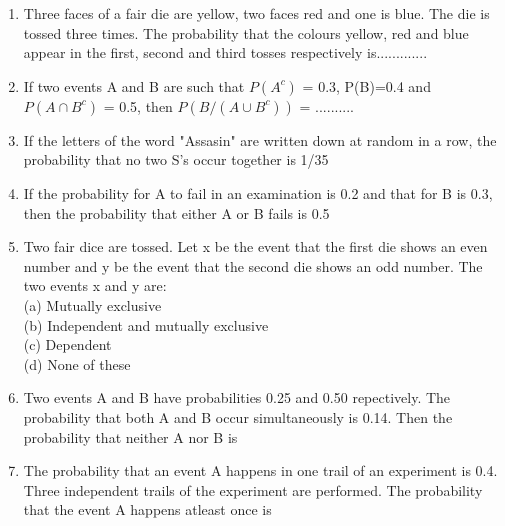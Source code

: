 \documentclass[journal,12pt,twocolumn]{IEEEtran}
\begin{document}
\begin{enumerate}[label=\arabic*]
	\item Three faces of a fair die are yellow, two faces red and one is blue. The die is tossed three times. The probability that the colours yellow, red and blue appear in the first, second and third tosses respectively is.............\\ 
  	\item If two events A and B are such that $P(A^{c})$ = 0.3, P(B)=0.4 and $P(A \cap B^{c})$ = 0.5, then $P(B/(A \cup B^{c}))$ = ..........\\
	\item If the letters of the word "Assasin" are written down at random in a row, the probability that no two S's occur together is 1/35\\
	\item If the probability for A to fail in an examination is 0.2 and that for B is 0.3, then the probability that either A or B fails is 0.5\\
	\item Two fair dice are tossed. Let x be the event that the first die shows an even number and y be the event that the second die shows an odd number. The two events x and y are:\\
	(a) Mutually exclusive\\
	(b) Independent and mutually exclusive\\
	(c) Dependent\\
	(d) None of these\\
	\item Two events A and B have probabilities 0.25 and 0.50 repectively. The probability that both A and B occur simultaneously is 0.14. Then the probability that neither A nor B is
	\begin{itemize}
	\begin{multicols}{2}
	\item[(a)]0.39	\item[(b)]0.25	\item[(c)]0.11	\item[(d)]none of these
	\end{multicols}
	\end{itemize}
	\item The probability that an event A happens in one trail of an experiment is 0.4. Three independent trails of the experiment are performed. The probability that the event A happens atleast once is
	\begin{itemize}
	\begin{multicols}{2}
	\item[(a)]0.936	\item[(b)]0.784	\item[(c)]0.904	\item[(d)]none of these

\end{multicols}
\end{itemize}
\end{enumerate}
\end{document}
